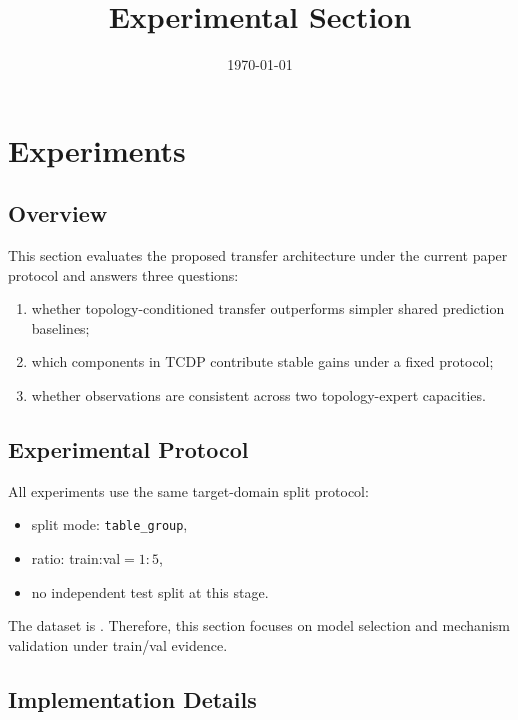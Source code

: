 ﻿\documentclass[10pt,a4paper]{article}
\title{Experimental Section}
\author{}
\date{\today}
\begin{document}
\maketitle

\section{Experiments}
\label{sec:experiments}

\subsection{Overview}

This section evaluates the proposed transfer architecture under the current paper protocol and answers three questions:
\begin{enumerate}[leftmargin=1.4em]
  \item whether topology-conditioned transfer outperforms simpler shared prediction baselines;
  \item which components in TCDP contribute stable gains under a fixed protocol;
  \item whether observations are consistent across two topology-expert capacities.
\end{enumerate}

\subsection{Experimental Protocol}

All experiments use the same target-domain split protocol:
\begin{itemize}[leftmargin=1.2em]
  \item split mode: \texttt{table\_group},
  \item ratio: train:val$=1:5$,
  \item no independent test split at this stage.
\end{itemize}
The dataset is
.
Therefore, this section focuses on model selection and mechanism validation under train/val evidence.

\subsection{Implementation Details}
\end{document}
